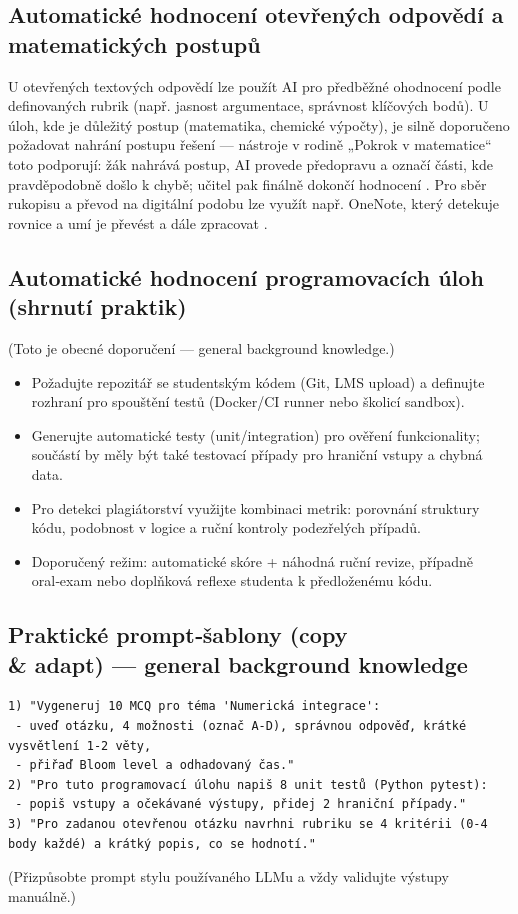 \subsection*{Automatické hodnocení otevřených odpovědí a matematických postupů}
U otevřených textových odpovědí lze použít AI pro předběžné ohodnocení podle definovaných rubrik (např. jasnost argumentace, správnost klíčových bodů). U úloh, kde je důležitý postup (matematika, chemické výpočty), je silně doporučeno požadovat nahrání postupu řešení — nástroje v rodině „Pokrok v matematice“ toto podporují: žák nahrává postup, AI provede předopravu a označí části, kde pravděpodobně došlo k chybě; učitel pak finálně dokončí hodnocení \cite{kb_ai_101_tipu_pdf_04e4a115_page_8_1}. Pro sběr rukopisu a převod na digitální podobu lze využít např. OneNote, který detekuje rovnice a umí je převést a dále zpracovat \cite{kb_ai_101_tipu_pdf_04e4a115_page_8_1}.

\subsection*{Automatické hodnocení programovacích úloh (shrnutí praktik)}
(Toto je obecné doporučení — general background knowledge.)
\begin{itemize}
  \item Požadujte repozitář se studentským kódem (Git, LMS upload) a definujte rozhraní pro spouštění testů (Docker/CI runner nebo školicí sandbox).
  \item Generujte automatické testy (unit/integration) pro ověření funkcionality; součástí by měly být také testovací případy pro hraniční vstupy a chybná data.
  \item Pro detekci plagiátorství využijte kombinaci metrik: porovnání struktury kódu, podobnost v logice a ruční kontroly podezřelých případů.
  \item Doporučený režim: automatické skóre + náhodná ruční revize, případně oral‑exam nebo doplňková reflexe studenta k předloženému kódu.
\end{itemize}

\subsection*{Praktické prompt‑šablony (copy \\ \& adapt) — general background knowledge}
\begin{verbatim}
1) "Vygeneruj 10 MCQ pro téma 'Numerická integrace':
 - uveď otázku, 4 možnosti (označ A-D), správnou odpověď, krátké vysvětlení 1-2 věty,
 - přiřaď Bloom level a odhadovaný čas."
2) "Pro tuto programovací úlohu napiš 8 unit testů (Python pytest): 
 - popiš vstupy a očekávané výstupy, přidej 2 hraniční případy."
3) "Pro zadanou otevřenou otázku navrhni rubriku se 4 kritérii (0-4 body každé) a krátký popis, co se hodnotí."
\end{verbatim}
(Přizpůsobte prompt stylu používaného LLMu a vždy validujte výstupy manuálně.)

